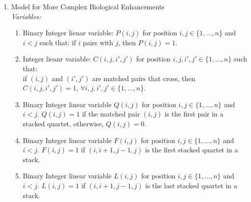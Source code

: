 \documentclass[11pt]{article}
\begin{document}
{\begin{enumerate}
\begin{enumerate}
    
    \item $P(i,j)=0$ if $|i-j|\leq 3, \forall i,j\in \{1,\dots, n\}$. Any pair must be at least distance 3 away.

    \item For each $j\in  \{1,\dots, n\}$, $\sum_{k>j}P(j,k)+\sum_{k<j}P(k,j)\leq 1 \textrm{ for all }k\in \{1,\dots, n\}$. Each character can be in at most one matched pair.
    
    \item For every four positions, say $i,i',j ,j'\in \{1,\dots, n\}$ where $i<i'<j<j'$ such that $P(i,j)+P(i',j')\leq 1, \forall i,j,i',j' \in \{1,\dots, n\}$. Non-crossing or nested condition.
    
\end{enumerate}


\item Model for More Complex Biological Enhancements\\
\textit{Variables:}
\begin{enumerate}
    \item Binary Integer lienar variable: $P(i,j)$ for position $i,j\in \{1,\dots, n\}$ and $i<j$ such that:
    if $i$ pairs with $j$, then $P(i,j)=1$.\\

    \item Integer lieanr variable: $C(i,j,i',j')$ for position $i,j,i',j'\in \{1,\dots, n\}$ such that:\\
    if $(i,j)$ and $(i',j')$ are matched pairs that cross, then $C(i,j,i',j')=1$, $\forall i,j,i',j' \in \{1,\dots, n\}$.\\

    \item Binary Integer linear variable $Q(i,j)$ for position $i,j\in \{1,\dots, n\}$ and $i<j$. $Q(i,j)=1$ if the matched pair $(i,j)$ is the first pair in a stacked quartet, otherwise, $Q(i,j)=0$.\\

    \item Binary Integer linear variable $F(i,j)$ for position $i,j\in \{1,\dots, n\}$ and $i<j$. $F(i,j)=1$ if $(i,i+1,j-1,j)$ is the first stacked quartet in a stack.\\

    \item Binary Integer linear variable $L(i,j)$ for position $i,j\in \{1,\dots, n\}$ and $i<j$. $L(i,j)=1$ if $(i,i+1,j-1,j)$ is the last stacked quartet in a stack.\\
\end{enumerate}


\end{enumerate}}
\end{document}
